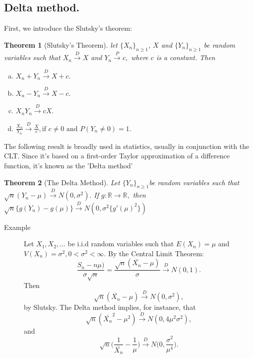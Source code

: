 \documentclass[12pt]{report} \addtolength{\textheight}{2in}
\newtheorem{thm}{Theorem}
\newcommand{\Realnum}{\mathbb{R}}
\newcommand{\pto}{\overset{P}{\longrightarrow}}
\newcommand{\dto}{\overset{D}{\longrightarrow}}
\begin{document}
 \subsection*{Delta method.}
 First, we introduce the Slutsky's theorem:
 \begin{thm}[Slutsky's Theorem] let $\{X_n\}_{n\geq 1}$, $X$ and $\{Y_n\}_{n\geq 1}$ be random variables such that $X_n \dto X$ and $Y_n \pto c,$ where $c$ is a constant. Then
 \begin{enumerate}[(a)]
 \item $X_n + Y_n \dto X +c.$
 \item $X_n - Y_n \dto X-c.$
 \item $X_nY_n\dto cX.$
 \item $\frac{X_n}{Y_n} \dto \frac{X}{c}, \text{if $c \not= 0$ and $P(Y_n \not= 0)=1$}.$
 \end{enumerate} 
 \end{thm}
 The following result is broadly used in statistics, usually in conjunction with the CLT. Since it's based on a first-order Taylor approximation of a difference function, it's known as the 'Delta method'
 
 \begin{thm} [The Delta Method] Let $\{Y_n\}_{n\geq1}$be random variables such that $\sqrt{n}(Y_n-\mu)\dto N(0,\sigma^2).$ If $g:\Realnum \to \Realnum,$ then $\sqrt{n}\{g(Y_n)-g(\mu)\} \dto N(0,\sigma^2\{g'(\mu)^2\})$
 \end{thm}
 \begin{description}
 \item[Example] Let $X_1,X_2,\dots$ be i.i.d random variables such that $E(X_n)=\mu$ and $V(X_n)=\sigma^2, 0 < \sigma^2 < \infty.$ By the Central Limit Theorem:
 \begin{displaymath}
 \frac{S_n-n\mu)}{\sigma\sqrt{n}}=\frac{\sqrt{n}(\bar{X_n}-\mu)}{\sigma} \dto N(0,1).
 \end{displaymath}
 Then 
 \begin{displaymath}
 \sqrt{n} (\bar{X_n}-\mu) \dto N(0,\sigma^2),
 \end{displaymath}
 by Slutsky. The Delta method implies, for instance, that
 \begin{displaymath}
  \sqrt{n} (\bar{X_n}^2-\mu^2) \dto N(0,4\mu^2\sigma^2),
 \end{displaymath}
 and
 \begin{displaymath}
 \sqrt{n}\Bigg( \frac{1}{\bar{X_n}}-\frac{1}{\mu}\Bigg) \dto N\Bigg(0,\frac{\sigma^2}{\mu^4}\Bigg).
 \end{displaymath}
 \end{description}
\end{document}
